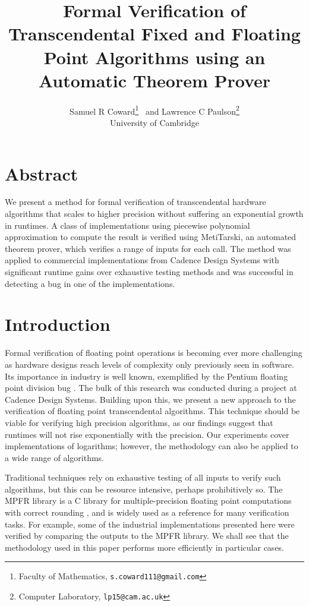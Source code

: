 \documentclass[a4paper]{article}
\begin{document}
\title{Formal Verification of Transcendental Fixed and Floating Point Algorithms using an Automatic Theorem Prover}
\author{Samuel R Coward\footnote{Faculty of Mathematics, \texttt{s.coward111@gmail.com}} \ and Lawrence C Paulson\footnote{Computer Laboratory, \texttt{lp15@cam.ac.uk}} \\
      University of Cambridge}

\maketitle

\section*{Abstract}

We present a method for formal verification of transcendental hardware algorithms that scales to higher precision without suffering an exponential growth in runtimes. A class of implementations using piecewise polynomial approximation to compute the result is verified using MetiTarski, an automated theorem prover, which verifies a range of inputs for each call. The method was applied to commercial implementations from Cadence Design Systems with significant runtime gains over exhaustive testing methods and was successful in detecting a bug in one of the implementations.  

\section{Introduction}

Formal verification of floating point operations is becoming ever more challenging as hardware designs reach levels of complexity only previously seen in software. Its importance in industry is well known, exemplified by the Pentium floating point division bug \cite{pratt1995anatomy}. The bulk of this research was conducted during a project at Cadence Design Systems. Building upon this, we present a new approach to the verification of floating point transcendental algorithms. This technique should be viable for verifying high precision algorithms, as our findings suggest that runtimes will not rise exponentially with the precision.  Our experiments cover implementations of logarithms; however, the methodology can also be applied to a wide range of algorithms. 

Traditional techniques rely on exhaustive testing of all inputs to verify such algorithms, but this can be resource intensive, perhaps prohibitively so. The MPFR library is a C library for multiple-precision floating point computations with correct rounding \cite{fousse2007mpfr}, and is widely used as a reference for many verification tasks. For example, some of the industrial implementations presented here were verified by comparing the outputs to the MPFR library. We shall see that the methodology used in this paper performs more efficiently in particular cases. 
\end{document}
